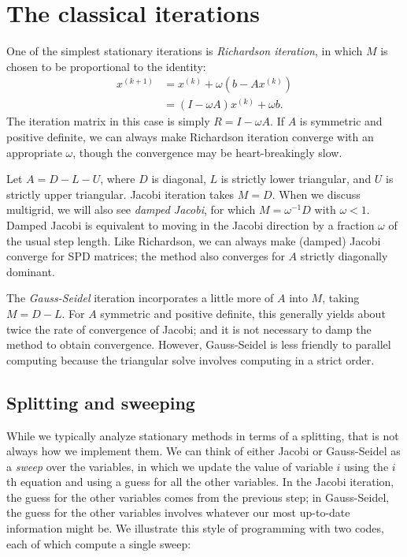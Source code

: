 \section{The classical iterations}

One of the simplest stationary iterations is {\em Richardson iteration},
in which $M$ is chosen to be proportional to the identity:
\begin{align*}
  x^{(k+1)} &= x^{(k)} + \omega (b-Ax^{(k)}) \\
            &= (I-\omega A) x^{(k)} + \omega b.
\end{align*}
The iteration matrix in this case is simply $R = I - \omega A$.  If $A$
is symmetric and positive definite, we can always make Richardson
iteration converge with an appropriate $\omega$, though the convergence
may be heart-breakingly slow.

Let $A = D - L - U$, where $D$ is diagonal, $L$ is strictly lower
triangular, and $U$ is strictly upper triangular.  Jacobi iteration
takes $M = D$.  When we discuss multigrid, we will also see  {\em damped
Jacobi}, for which $M = \omega^{-1} D$ with $\omega < 1$.  Damped Jacobi
is equivalent to moving in the Jacobi direction by a fraction $\omega$
of the usual step length.  Like Richardson, we can always make (damped)
Jacobi converge for SPD matrices; the method also converges for $A$
strictly diagonally dominant.

The {\em Gauss-Seidel} iteration incorporates a little more of $A$ into
$M$, taking $M = D-L$.  For $A$ symmetric and positive definite, this
generally yields about twice the rate of convergence of Jacobi; and it
is not necessary to damp the method to obtain convergence.  However,
Gauss-Seidel is less friendly to parallel computing because the
triangular solve involves computing in a strict order.

\subsection{Splitting and sweeping}

While we typically analyze stationary methods in terms of a splitting,
that is not always how we implement them.  We can think of either Jacobi
or Gauss-Seidel as a {\em sweep} over the variables, in which we update
the value of variable $i$ using the $i$th equation and using a guess for
all the other variables.  In the Jacobi iteration, the guess for the
other variables comes from the previous step; in Gauss-Seidel, the guess
for the other variables involves whatever our most up-to-date information
might be.  We illustrate this style of programming with two codes, each
of which compute a single sweep:

